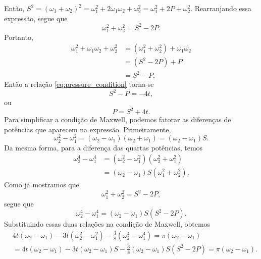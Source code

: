 \documentclass[11pt,a4paper]{article}
\begin{document}
%
Então, $S^2 = (\omega_1+\omega_2)^2 = \omega_1^2 +2\omega_1\omega_2 +\omega_2^2 = \omega_1^2+ 2P +\omega_2^2$. Rearranjando essa expressão, segue que
%
\begin{equation}
    \omega_1^2+\omega_2^2
    =
    S^2-2P.
\end{equation}
%
Portanto,
%
\begin{align}
    \omega_1^2+\omega_1\omega_2+\omega_2^2
    &=
    (\omega_1^2+\omega_2^2)
    +\omega_1\omega_2
    \nonumber\\
    &=
    (S^2-2P)+P
    \nonumber\\
    &=
    S^2-P.
\end{align}
%
Então a relação \eqref{eq:pressure_condition} torna-se
%
\begin{equation}
    S^2-P=-4t,
\end{equation}
%
ou
%
\begin{equation}
    P=S^2+4t.
    \label{eq:P}
\end{equation}
%
%
Para simplificar a condição de Maxwell, podemos fatorar as diferenças
de potências que aparecem na expressão. Primeiramente,
%
\begin{equation}
    \omega_2^2-\omega_1^2
    =
    (\omega_2-\omega_1)(\omega_2+\omega_1)
    =
    (\omega_2-\omega_1)S.
\end{equation}
%
Da mesma forma, para a diferença das quartas potências, temos
%
\begin{align}
    \omega_2^4-\omega_1^4
    &=
    (\omega_2^2-\omega_1^2)
    (\omega_2^2+\omega_1^2)
    \nonumber\\
    &=
    (\omega_2-\omega_1)
    S
    (\omega_1^2+\omega_2^2).
\end{align}
%
Como já mostramos que
%
\begin{equation}
    \omega_1^2+\omega_2^2=S^2-2P,
\end{equation}
%
segue que
%
\begin{equation}
    \omega_2^4-\omega_1^4
    =
    (\omega_2-\omega_1)
    S(S^2-2P).
\end{equation}
%
Substituindo essas duas relações na condição de Maxwell, obtemos
%
\begin{align}
    &4t(\omega_2-\omega_1)
    -
    3t(\omega_2^2-\omega_1^2)
    -
    \frac38(\omega_2^4-\omega_1^4)
    =
    \pi(\omega_2-\omega_1)
    \nonumber\\
    &=
    4t(\omega_2-\omega_1)
    -
    3t(\omega_2-\omega_1)S
    -
    \frac38
    (\omega_2-\omega_1)
    S(S^2-2P)
    =
    \pi(\omega_2-\omega_1).
\end{align}
\end{document}
